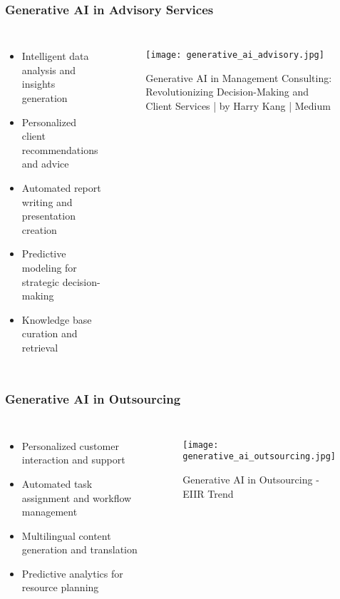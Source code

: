 \begin{frame}[fragile]\frametitle{Generative AI in Advisory Services}
\begin{columns}
\begin{itemize}
    \item Intelligent data analysis and insights generation
    \item Personalized client recommendations and advice
    \item Automated report writing and presentation creation
    \item Predictive modeling for strategic decision-making
    \item Knowledge base curation and retrieval
\end{itemize}
\begin{figure}
    \texttt{[image: generative\_ai\_advisory.jpg]}
    \caption{Generative AI in Management Consulting: Revolutionizing Decision-Making and Client Services | by Harry Kang | Medium}
\end{figure}
\end{columns}
\end{frame}

\begin{frame}[fragile]\frametitle{Generative AI in Outsourcing}
\begin{columns}
\begin{itemize}
    \item Personalized customer interaction and support
    \item Automated task assignment and workflow management
    \item Multilingual content generation and translation
    \item Predictive analytics for resource planning
\end{itemize}
\begin{figure}
    \texttt{[image: generative\_ai\_outsourcing.jpg]}
    \caption{Generative AI in Outsourcing - EIIR Trend}
\end{figure}
\end{columns}
\end{frame}

